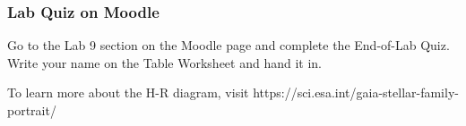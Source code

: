 \documentclass[main.tex]{subfiles}
\begin{document}
\subsubsection{Lab Quiz on Moodle}
Go to the Lab 9 section on the Moodle page and complete the End-of-Lab Quiz. Write your name on the Table Worksheet and hand it in.

To learn more about the H-R diagram, visit https://sci.esa.int/gaia-stellar-family-portrait/
\end{document}

